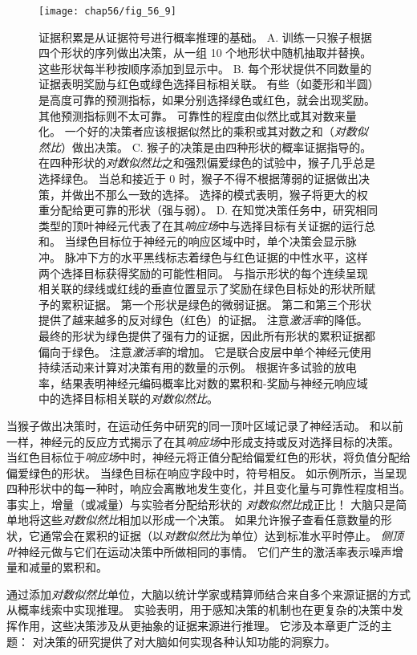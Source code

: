 \begin{figure}[htbp]
	\centering
	\texttt{[image: chap56/fig\_56\_9]}
	\caption{证据积累是从证据符号进行概率推理的基础。
		A. 训练一只猴子根据四个形状的序列做出决策，从一组 10 个地形状中随机抽取并替换。
		这些形状每半秒按顺序添加到显示中。
		B. 每个形状提供不同数量的证据表明奖励与红色或绿色选择目标相关联。
		有些（如菱形和半圆）是高度可靠的预测指标，如果分别选择绿色或红色，就会出现奖励。
		其他预测指标则不太可靠。
		可靠性的程度由似然比或其对数来量化。
		一个好的决策者应该根据似然比的乘积或其对数之和（\textit{对数似然比}）做出决策。
		C. 猴子的决策是由四种形状的概率证据指导的。
		在四种形状的\textit{对数似然比}之和强烈偏爱绿色的试验中，猴子几乎总是选择绿色。
		当总和接近于 0 时，猴子不得不根据薄弱的证据做出决策，并做出不那么一致的选择。
		选择的模式表明，猴子将更大的权重分配给更可靠的形状（强与弱）。
		D. 在知觉决策任务中，研究相同类型的顶叶神经元代表了在其\textit{响应场}中与选择目标有关证据的运行总和。
		当绿色目标位于神经元的响应区域中时，单个决策会显示脉冲。
		脉冲下方的水平黑线标志着绿色与红色证据的中性水平，这样两个选择目标获得奖励的可能性相同。
		与指示形状的每个连续呈现相关联的绿线或红线的垂直位置显示了奖励在绿色目标处的形状所赋予的累积证据。
		第一个形状是绿色的微弱证据。
		第二和第三个形状提供了越来越多的反对绿色（红色）的证据。
		注意\textit{激活率}的降低。
		最终的形状为绿色提供了强有力的证据，因此所有形状的累积证据都偏向于绿色。
		注意\textit{激活率}的增加。
		它是联合皮层中单个神经元使用持续活动来计算对决策有用的数量的示例。
		根据许多试验的放电率，结果表明神经元编码概率比对数的累积和-奖励与神经元响应域中的选择目标相关联的\textit{对数似然比}\cite{yang2007probabilistic}。}
	\label{fig:56_9}
\end{figure}


当猴子做出决策时，在运动任务中研究的同一顶叶区域记录了神经活动。
和以前一样，神经元的反应方式揭示了在其\textit{响应场}中形成支持或反对选择目标的决策。
当红色目标位于\textit{响应场}中时，神经元将正值分配给偏爱红色的形状，将负值分配给偏爱绿色的形状。
当绿色目标在响应字段中时，符号相反。
如示例所示，当呈现四种形状中的每一种时，响应会离散地发生变化，并且变化量与可靠性程度相当。
事实上，增量（或减量）与实验者分配给形状的 \textit{对数似然比}成正比！
大脑只是简单地将这些\textit{对数似然比}相加以形成一个决策。
如果允许猴子查看任意数量的形状，它通常会在累积的证据（以\textit{对数似然比}为单位）达到标准水平时停止。
\textit{侧顶叶}神经元做与它们在运动决策中所做相同的事情。
它们产生的激活率表示噪声增量和减量的累积和。


通过添加\textit{对数似然比}单位，大脑以统计学家或精算师结合来自多个来源证据的方式从概率线索中实现推理。
实验表明，用于感知决策的机制也在更复杂的决策中发挥作用，这些决策涉及从更抽象的证据来源进行推理。
它涉及本章更广泛的主题：
对决策的研究提供了对大脑如何实现各种认知功能的洞察力。



